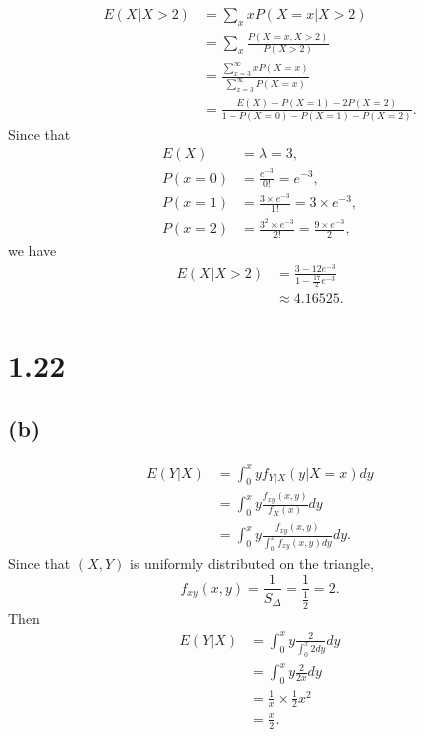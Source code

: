 \documentclass{article}
\begin{document}
\begin{align*}
    E(X|X > 2) &= \sum\limits_x x P(X=x|X>2)  \\
    &= \sum\limits_x \frac{P(X = x, X > 2)}{P(X > 2)} \\
    &= \frac{\sum\limits_{x = 3}^\infty x P(X = x)}{\sum\limits_{x = 3}^\infty P(X = x)} \\
    &= \frac{E(X) - P(X = 1) - 2 P(X = 2)}{1 - P(X = 0) - P(X = 1) - P(X = 2)}.
\end{align*}
Since that
\begin{align*}
    E(X) &= \lambda = 3, \\
    P(x = 0) &= \frac{e^{-3}}{0!} = e^{-3}, \\
    P(x = 1) &= \frac{3 \times e^{-3}}{1!} = 3 \times e^{-3}, \\
    P(x = 2) &= \frac{3^2 \times e^{-3}}{2!} = \frac{9 \times e^{-3}}{2},
\end{align*}
we have
\begin{align*}
    E(X|X > 2) &= \frac{3 - 12 e^{-3}}{1 - \frac{17}{2} e^{-3}} \\
    &\approx 4.16525.
\end{align*}

\section{1.22}
\subsection{(b)}
\begin{align*}
    E(Y|X) &= \int_0^x y f_{Y|X}(y|X = x) dy \\
    &= \int_0^x y \frac{f_{xy}(x, y)}{f_X(x)} dy \\
    &= \int_0^x y \frac{f_{xy}(x, y)}{\int_0^x f_{xy}(x, y) dy} dy.
\end{align*}
Since that $(X, Y)$ is uniformly distributed on the triangle, 
\begin{equation*}
    f_{xy}(x, y) = \frac{1}{S_{\Delta}} = \frac{1}{\frac{1}{2}} = 2.
\end{equation*}
Then
\begin{align*}
    E(Y|X) &= \int_0^x y \frac{2}{\int_0^x 2 dy} dy \\
    &= \int_0^x y \frac{2}{2x} dy \\
    &= \frac{1}{x}\times \frac{1}{2} x^2 \\
    &= \frac{x}{2}.
\end{align*}
\end{document}
